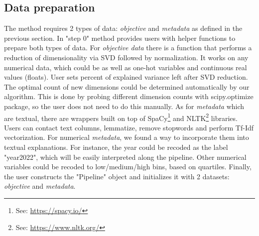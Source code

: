 \documentclass[
 twocolumn,
 hf,
]{ceurart}
\begin{document}
\subsection{Data preparation}\label{subsec:data-preparation}
The method requires 2 types of data: \textit{objective} and \textit{metadata} as defined in the previous section.
In "step 0" method provides users with helper functions to prepare both types of data.
For \textit{objective data} there is a function that performs a reduction of dimensionality via SVD followed by normalization.
It works on any numerical data, which could be as well as one-hot variables and continuous real values (floats).
User sets percent of explained variance left after SVD reduction.
The optimal count of new dimensions could be determined automatically by our algorithm.
This is done by probing different dimension counts with scipy.optimize package, so the user does not need to do this manually.
As for \textit{metadata} which are textual, there are wrappers built on top of SpaCy\footnote{See: \url{https://spacy.io/}} and NLTK\footnote{See: \url{https://www.nltk.org/}} libraries.
Users can contact text columns, lemmatize, remove stopwords and perform Tf-Idf vectorization.
For numerical \textit{metadata}, we found a way to incorporate them into textual explanations.
For instance, the year could be recoded as the label "year2022", which will be easily interpreted along the pipeline.
Other numerical variables could be recoded to low/medium/high bins, based on quartiles.
Finally, the user constructs the "Pipeline" object and initializes it with 2 datasets: \textit{objective} and \textit{metadata}.
\end{document}
